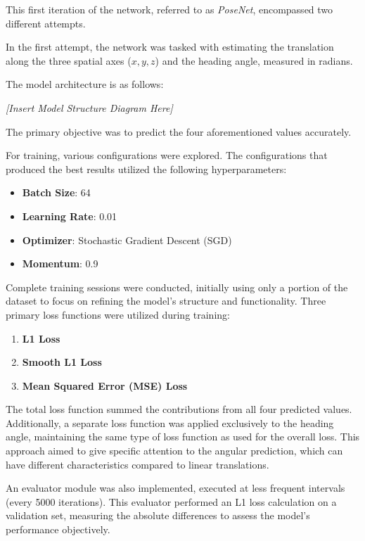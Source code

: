 This first iteration of the network, referred to as \textit{PoseNet}, encompassed two different attempts.

In the first attempt, the network was tasked with estimating the translation along the three spatial axes (\( x, y, z \)) and the heading angle, measured in radians.

The model architecture is as follows:
\begin{center}
\textit{[Insert Model Structure Diagram Here]}
\end{center}

The primary objective was to predict the four aforementioned values accurately.

For training, various configurations were explored. The configurations that produced the best results utilized the following hyperparameters:
\begin{itemize}
    \item \textbf{Batch Size}: 64
    \item \textbf{Learning Rate}: 0.01
    \item \textbf{Optimizer}: Stochastic Gradient Descent (SGD)
    \item \textbf{Momentum}: 0.9
\end{itemize}

Complete training sessions were conducted, initially using only a portion of the dataset to focus on refining the model's structure and functionality. Three primary loss functions were utilized during training:
\begin{enumerate}
    \item \textbf{L1 Loss}
    \item \textbf{Smooth L1 Loss}
    \item \textbf{Mean Squared Error (MSE) Loss}
\end{enumerate}

The total loss function summed the contributions from all four predicted values. Additionally, a separate loss function was applied exclusively to the heading angle, maintaining the same type of loss function as used for the overall loss. This approach aimed to give specific attention to the angular prediction, which can have different characteristics compared to linear translations.

An evaluator module was also implemented, executed at less frequent intervals (every 5000 iterations). This evaluator performed an L1 loss calculation on a validation set, measuring the absolute differences to assess the model's performance objectively.

